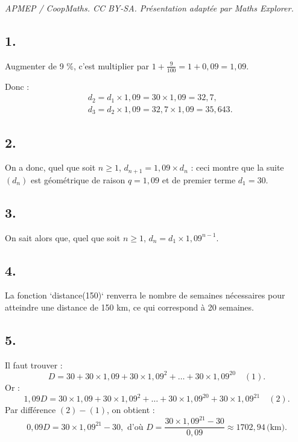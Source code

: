 \documentclass[10pt]{article}
\begin{document}
\noindent\textit{APMEP / CoopMaths. CC BY-SA. Présentation adaptée par Maths Explorer.}\par\medskip
\subsection*{1.}

Augmenter de 9 \%, c'est multiplier par \(1 + \frac{9}{100} = 1 + 0{,}09 = 1{,}09\).

Donc :
\begin{align*}
&d_2 = d_1 \times 1{,}09 = 30 \times 1{,}09 = 32{,}7, \\
&d_3 = d_2 \times 1{,}09 = 32{,}7 \times 1{,}09 = 35{,}643.
\end{align*}

\subsection*{2.}

On a donc, quel que soit \( n \geqslant 1 \), \(d_{n+1} = 1{,}09 \times d_n\) : ceci montre que la suite \( (d_n) \) est géométrique de raison \(q = 1{,}09\) et de premier terme \(d_1 = 30\).

\subsection*{3.}

On sait alors que, quel que soit \(n \geqslant 1\), \( d_n = d_1 \times 1{,}09^{n-1} \).

\subsection*{4.}

La fonction `distance(150)` renverra le nombre de semaines nécessaires pour atteindre une distance de 150 km, ce qui correspond à 20 semaines.

\subsection*{5.}

Il faut trouver :
\[
D = 30 + 30 \times 1{,}09 + 30 \times 1{,}09^2 + \dots + 30 \times 1{,}09^{20} \quad (1).
\]
Or :
\[
1{,}09D = 30 \times 1{,}09 + 30 \times 1{,}09^2 + \dots + 30 \times 1{,}09^{20} + 30 \times 1{,}09^{21} \quad (2).
\]
Par différence \((2) - (1) \), on obtient :
\[
0{,}09D = 30 \times 1{,}09^{21} - 30, \text{ d'où } D = \frac{30 \times 1{,}09^{21} - 30}{0{,}09} \approx 1702{,}94 \, \text{(km)}.
\]
\end{document}
